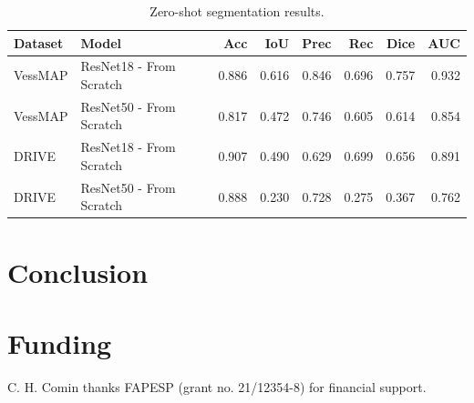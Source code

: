 \documentclass[%
reprint,
nofootinbib,
 amsmath,amssymb,
aps,
superscriptaddress,
showkeys,
longbibliography
]{revtex4-1}
\begin{document}
\begin{table}[t]
\caption{Zero-shot segmentation results.}
\label{tab:zero_shot_results}
\centering
\begingroup
\small
\setlength{\tabcolsep}{3pt}
\renewcommand{\arraystretch}{1.15}
\begin{tabularx}{\textwidth}{l X r r r r r r}
\hline
	\textbf{Dataset} & \textbf{Model} & \textbf{Acc} & \textbf{IoU} & \textbf{Prec} & \textbf{Rec} & \textbf{Dice} & \textbf{AUC} \\
\hline
VessMAP & ResNet18 - From Scratch & 0.886 & 0.616 & 0.846 & 0.696 & 0.757 & 0.932 \\
VessMAP & ResNet50 - From Scratch & 0.817 & 0.472 & 0.746 & 0.605 & 0.614 & 0.854 \\
\hline
DRIVE & ResNet18 - From Scratch & 0.907 & 0.490 & 0.629 & 0.699 & 0.656 & 0.891 \\
DRIVE & ResNet50 - From Scratch & 0.888 & 0.230 & 0.728 & 0.275 & 0.367 & 0.762 \\
\hline
\end{tabularx}
\endgroup
\end{table}


\section{Conclusion}
\label{s:conclusion}




\section*{Funding}
C. H. Comin thanks FAPESP (grant no. 21/12354-8) for financial support. 



\end{document}
